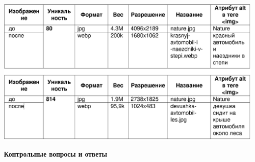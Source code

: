 \noindent
\begin{minipage}{\linewidth}
\end{minipage}
\bigskip

\noindent
\begin{minipage}{\linewidth}
    \includegraphics[width=\linewidth]{tables}
\end{minipage}
\bigskip

\textbf{Контрольные вопросы и ответы}

